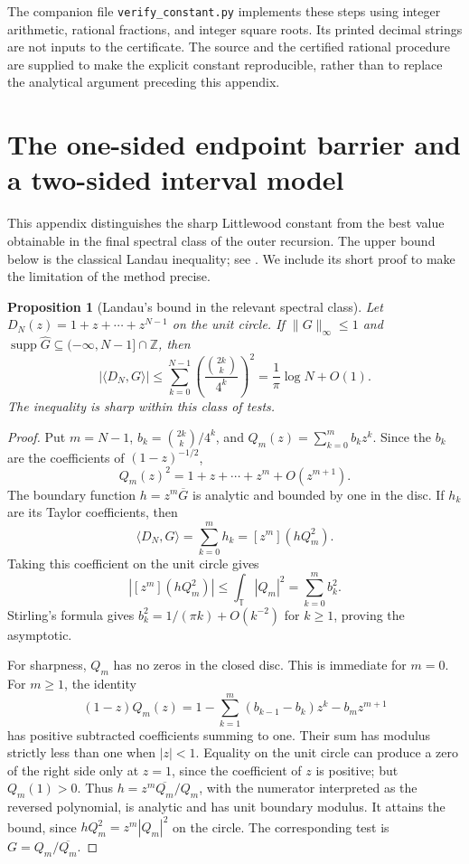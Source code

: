 \documentclass[11pt,reqno]{amsart}
\numberwithin{equation}{section}
\newtheorem{proposition}[theorem]{Proposition}
\theoremstyle{definition}
\theoremstyle{remark}
\newcommand{\Z}{\mathbb Z}
\newcommand{\T}{\mathbb T}
\newcommand{\norm}[1]{\lVert#1\rVert}
\newcommand{\ip}[2]{\langle#1,#2\rangle}
\DeclareMathOperator{\supp}{supp}
\begin{document}
The companion file \texttt{verify\_constant.py} implements these steps
using integer arithmetic, rational fractions, and integer square roots.
Its printed decimal strings are not inputs to the certificate. The
source and the certified rational procedure are supplied to make the
explicit constant reproducible, rather than to replace the analytical
argument preceding this appendix.

\section{The one-sided endpoint barrier and a two-sided interval model}
\label{app:landau}

This appendix distinguishes the sharp Littlewood constant from the
best value obtainable in the final spectral class of the outer
recursion. The upper bound below is the classical Landau inequality;
see \cite{LandauAsymptotics,Kovalev}. We include its short proof to make
the limitation of the method precise.

\begin{proposition}[Landau's bound in the relevant spectral class]
\label{prop:landau}
Let $D_N(z)=1+z+\cdots+z^{N-1}$ on the unit circle. If
$\norm G_\infty\le1$ and $\supp\widehat G\subseteq(-\infty,N-1]\cap\Z$,
then
\begin{equation}\label{eq:landau}
 |\ip{D_N}G|\le
 \sum_{k=0}^{N-1}\left(\frac{\binom{2k}{k}}{4^k}\right)^2
 =\frac1\pi\log N+O(1).
\end{equation}
The inequality is sharp within this class of tests.
\end{proposition}
\begin{proof}
Put $m=N-1$, $b_k=\binom{2k}{k}/4^k$, and
$Q_m(z)=\sum_{k=0}^m b_kz^k$. Since the $b_k$ are the coefficients of
$(1-z)^{-1/2}$,
\[
 Q_m(z)^2=1+z+\cdots+z^m+O(z^{m+1}).
\]
The boundary function $h=z^m\overline G$ is analytic and bounded by
one in the disc. If $h_k$ are its Taylor coefficients, then
\[
 \ip{D_N}G=\sum_{k=0}^m h_k=[z^m](hQ_m^2).
\]
Taking this coefficient on the unit circle gives
\[
 |[z^m](hQ_m^2)|\le\int_\T|Q_m|^2=\sum_{k=0}^m b_k^2.
\]
Stirling's formula gives $b_k^2=1/(\pi k)+O(k^{-2})$ for $k\ge1$,
proving the asymptotic.

For sharpness, $Q_m$ has no zeros in the closed disc. This is immediate
for $m=0$. For $m\ge1$, the identity
\[
 (1-z)Q_m(z)=1-\sum_{k=1}^m(b_{k-1}-b_k)z^k-b_mz^{m+1}
\]
has positive subtracted coefficients summing to one. Their sum has
modulus strictly less than one when $|z|<1$. Equality on the unit
circle can produce a zero of the right side only at $z=1$, since the
coefficient of $z$ is positive; but $Q_m(1)>0$. Thus
$h=z^m\overline{Q_m}/Q_m$, with the numerator interpreted as the
reversed polynomial, is analytic and has unit boundary modulus. It
attains the bound, since
$hQ_m^2=z^m|Q_m|^2$ on the circle. The corresponding test is
$G=Q_m/\overline{Q_m}$.
\end{proof}
\end{document}
